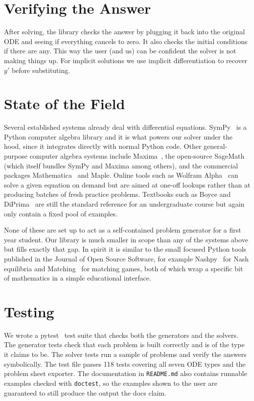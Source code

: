 \documentclass{article}
\begin{document}
\section{Verifying the Answer}
After solving, the library checks the answer by plugging it back into the original ODE and seeing if everything cancels to zero. It also checks the initial conditions if there are any. This way the user (and us) can be confident the solver is not making things up. For implicit solutions we use implicit differentiation to recover $y'$ before substituting.

\section{State of the Field}
Several established systems already deal with differential equations. SymPy~\cite{sympy} is a Python computer algebra library and it is what powers our solver under the hood, since it integrates directly with normal Python code. Other general-purpose computer algebra systems include Maxima~\cite{maxima}, the open-source SageMath~\cite{sagemath} (which itself bundles SymPy and Maxima among others), and the commercial packages Mathematica~\cite{mathematica} and Maple. Online tools such as Wolfram Alpha~\cite{wolframalpha} can solve a given equation on demand but are aimed at one-off lookups rather than at producing batches of fresh practice problems. Textbooks such as Boyce and DiPrima~\cite{boyce} are still the standard reference for an undergraduate course but again only contain a fixed pool of examples.

None of these are set up to act as a self-contained problem generator for a first year student. Our library is much smaller in scope than any of the systems above but fills exactly that gap. In spirit it is similar to the small focused Python tools published in the Journal of Open Source Software, for example Nashpy~\cite{nashpy} for Nash equilibria and Matching~\cite{matching} for matching games, both of which wrap a specific bit of mathematics in a simple educational interface.

\section{Testing}
We wrote a pytest~\cite{pytest} test suite that checks both the generators and the solvers. The generator tests check that each problem is built correctly and is of the type it claims to be. The solver tests run a sample of problems and verify the answers symbolically. The test file passes 118 tests covering all seven ODE types and the problem sheet exporter. The documentation in \texttt{README.md} also contains runnable examples checked with \texttt{doctest}, so the examples shown to the user are guaranteed to still produce the output the docs claim.
\end{document}
